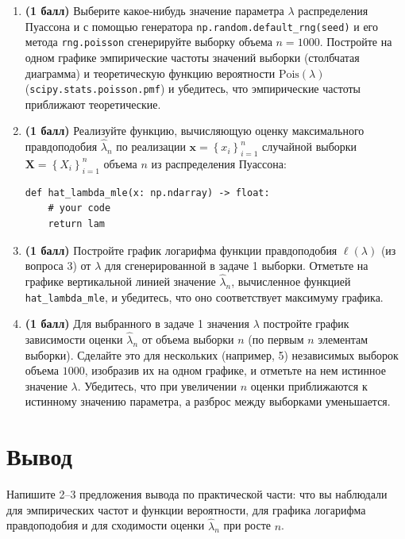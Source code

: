 \documentclass[a4paper,12pt]{article}
\newcommand{\pts}[1]{\textbf{(#1)}}
\begin{document}
\begin{enumerate}
  \item \pts{1 балл} Выберите какое-нибудь значение параметра $\lambda$ распределения Пуассона и с помощью генератора \lstinline|np.random.default_rng(seed)| и его метода \lstinline|rng.poisson| сгенерируйте выборку объема $n=1000$. Постройте на одном графике эмпирические частоты значений выборки (столбчатая диаграмма) и теоретическую функцию вероятности $\mathrm{Pois}(\lambda)$ (\lstinline|scipy.stats.poisson.pmf|) и убедитесь, что эмпирические частоты приближают теоретические.

  \item \pts{1 балл} Реализуйте функцию, вычисляющую оценку максимального правдоподобия $\hat\lambda_n$ по реализации $\mathbf{x}=\left\{x_i\right\}_{i=1}^n$ случайной выборки $\mathbf{X}=\left\{X_i\right\}_{i=1}^n$ объема $n$ из распределения Пуассона:
\begin{lstlisting}
def hat_lambda_mle(x: np.ndarray) -> float:
    # your code
    return lam
\end{lstlisting}

  \item \pts{1 балл} Постройте график логарифма функции правдоподобия $\ell(\lambda)$ (из вопроса 3) от $\lambda$ для сгенерированной в задаче 1 выборки. Отметьте на графике вертикальной линией значение $\hat\lambda_n$, вычисленное функцией \lstinline|hat_lambda_mle|, и убедитесь, что оно соответствует максимуму графика.

  \item \pts{1 балл} Для выбранного в задаче 1 значения $\lambda$ постройте график зависимости оценки $\hat\lambda_n$ от объема выборки $n$ (по первым $n$ элементам выборки). Сделайте это для нескольких (например, 5) независимых выборок объема $1000$, изобразив их на одном графике, и отметьте на нем истинное значение $\lambda$. Убедитесь, что при увеличении $n$ оценки приближаются к истинному значению параметра, а разброс между выборками уменьшается.

\end{enumerate}

\section*{Вывод}

Напишите 2--3 предложения вывода по практической части: что вы наблюдали для эмпирических частот и функции вероятности, для графика логарифма правдоподобия и для сходимости оценки $\hat\lambda_n$ при росте $n$.
\end{document}
